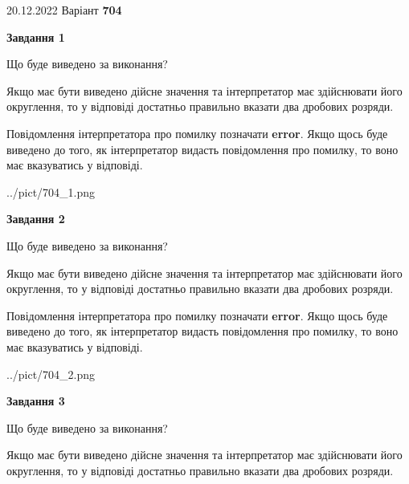 \documentclass[12pt, ukrainian]{article}
\begin{document}
{20.12.2022 Варіант \No \textbf { 704 }\par}
{
\begin {Large}

{\begin {center}\textbf{Завдання 1}\end {center}}\par
Що буде виведено за виконання? \par

Якщо має бути виведено дійсне значення та інтерпретатор має здійснювати його округлення, 
то у відповіді достатньо правильно вказати два дробових розряди.

Повідомлення інтерпретатора про помилку позначати \textbf{error}.
Якщо щось буде виведено до того, як інтерпретатор видасть повідомлення про помилку, 
то воно має вказуватись у відповіді. \par

\begin{center}
	{../pict/704_1.png}
\end{center}
\newpage

{\begin {center}\textbf{Завдання 2}\end {center}}\par
Що буде виведено за виконання? \par

Якщо має бути виведено дійсне значення та інтерпретатор має здійснювати його округлення, 
то у відповіді достатньо правильно вказати два дробових розряди.

Повідомлення інтерпретатора про помилку позначати \textbf{error}.
Якщо щось буде виведено до того, як інтерпретатор видасть повідомлення про помилку, 
то воно має вказуватись у відповіді. \par

\begin{center}
	{../pict/704_2.png}
\end{center}
\newpage

{\begin {center}\textbf{Завдання 3}\end {center}}\par
Що буде виведено за виконання? \par

Якщо має бути виведено дійсне значення та інтерпретатор має здійснювати його округлення, 
то у відповіді достатньо правильно вказати два дробових розряди.


\end{Large}}
\end{document}
